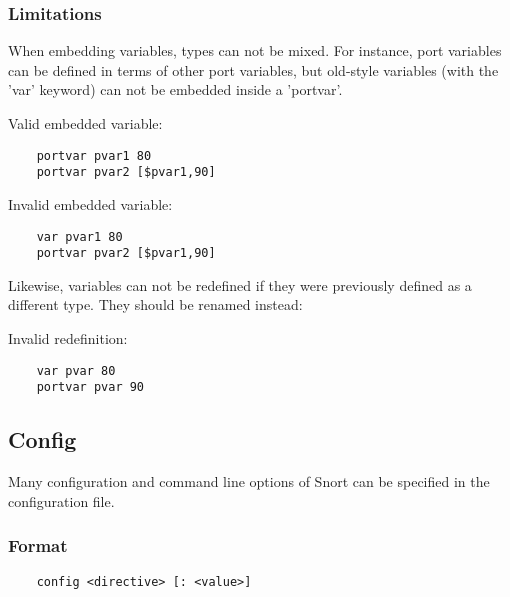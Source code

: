 \documentclass[english]{report}
\begin{document}
\subsubsection{Limitations}

When embedding variables, types can not be mixed.  For instance, port variables
can be defined in terms of other port variables, but old-style variables (with
the 'var' keyword) can not be embedded inside a 'portvar'.

Valid embedded variable:

\begin{verbatim}
    portvar pvar1 80
    portvar pvar2 [$pvar1,90]
\end{verbatim}

Invalid embedded variable:
        
\begin{verbatim}
    var pvar1 80
    portvar pvar2 [$pvar1,90]
\end{verbatim}

Likewise, variables can not be redefined if they were previously defined as a
different type.  They should be renamed instead:

Invalid redefinition:
        
\begin{verbatim}
    var pvar 80
    portvar pvar 90
\end{verbatim}

\subsection{Config}
\label{Config}

Many configuration and command line options of Snort can be specified in the
configuration file. 

\subsubsection{Format}

\begin{verbatim}
    config <directive> [: <value>]
\end{verbatim}
\end{document}
